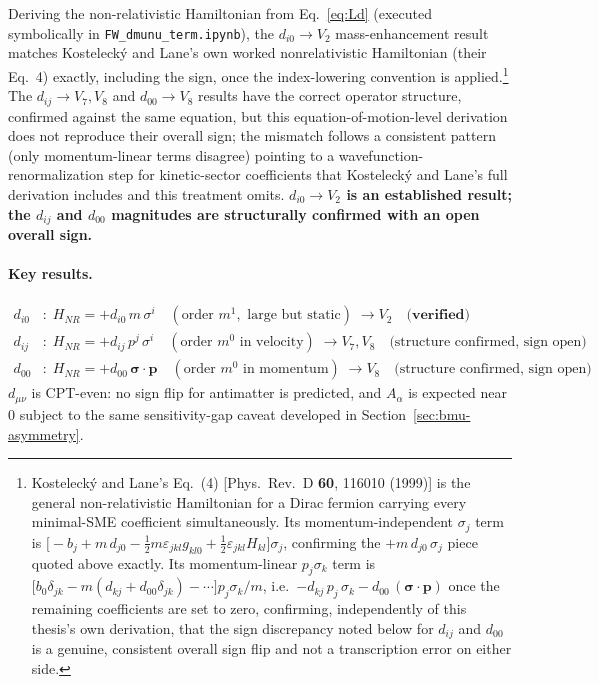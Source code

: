 \documentclass[main]{subfiles}
\begin{document}
Deriving the non-relativistic Hamiltonian from Eq.~\eqref{eq:Ld} (executed
symbolically in \texttt{FW\_dmunu\_term.ipynb}), the $d_{i0}\to V_2$
mass-enhancement result matches Kostelecký and Lane's own worked
nonrelativistic Hamiltonian (their Eq.~4) exactly, including the sign,
once the index-lowering convention is applied.\footnote{Kostelecký and
Lane's Eq.~(4) [Phys.\ Rev.\ D \textbf{60}, 116010 (1999)] is the general
non-relativistic Hamiltonian for a Dirac fermion carrying every
minimal-SME coefficient simultaneously. Its momentum-independent
$\sigma_j$ term is $\big[-b_j+m\,d_{j0}-\tfrac12
m\varepsilon_{jkl}g_{kl0}+\tfrac12\varepsilon_{jkl}H_{kl}\big]\sigma_j$,
confirming the $+m\,d_{j0}\,\sigma_j$ piece quoted above exactly. Its
momentum-linear $p_j\sigma_k$ term is
$\big[b_0\delta_{jk}-m(d_{kj}+d_{00}\delta_{jk})-\cdots\big]p_j\sigma_k/m$,
i.e.\ $-d_{kj}\,p_j\,\sigma_k-d_{00}\,(\boldsymbol\sigma\cdot\mathbf p)$
once the remaining coefficients are set to zero, confirming,
independently of this thesis's own derivation, that the sign discrepancy
noted below for $d_{ij}$ and $d_{00}$ is a genuine, consistent overall
sign flip and not a transcription error on either side.} The $d_{ij}\to V_7,V_8$ and
$d_{00}\to V_8$ results have the correct operator structure, confirmed
against the same equation, but this equation-of-motion-level derivation
does not reproduce their overall sign; the mismatch follows a consistent
pattern (only momentum-linear terms disagree) pointing to a
wavefunction-renormalization step for kinetic-sector coefficients that
Kostelecký and Lane's full derivation includes and this treatment omits.
\textbf{$d_{i0}\to V_2$ is an established result; the $d_{ij}$ and $d_{00}$
magnitudes are structurally confirmed with an open overall sign.}

\paragraph{Key results.}
\begin{align}
  d_{i0}&: \; H_{NR} = +d_{i0}\,m\,\sigma^i \quad (\text{order } m^1,\text{ large but static}) \;\to V_2 \quad \textbf{(verified)}\\
  d_{ij}&: \; H_{NR} = +d_{ij}\,p^j\,\sigma^i \quad (\text{order } m^0 \text{ in velocity}) \;\to V_7, V_8 \quad \text{(structure confirmed, sign open)}\\
  d_{00}&: \; H_{NR} = +d_{00}\,\boldsymbol\sigma\cdot\mathbf p \quad (\text{order } m^0 \text{ in momentum}) \;\to V_8 \quad \text{(structure confirmed, sign open)}
\end{align}
$d_{\mu\nu}$ is CPT-even: no sign flip for antimatter is predicted, and
$A_\alpha$ is expected near $0$ subject to the same sensitivity-gap caveat
developed in Section~\ref{sec:bmu-asymmetry}.
\end{document}
